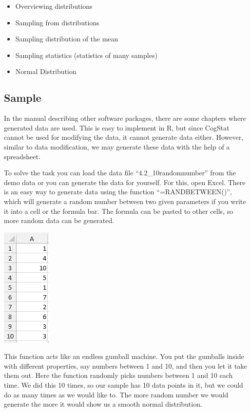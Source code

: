 \documentclass[
]{book}
\begin{document}
\begin{itemize}
\item
  Overviewing distributions
\item
  Sampling from distributions
\item
  Sampling distribution of the mean
\item
  Sampling statistics (statistics of many samples)
\item
  Normal Distribution
\end{itemize}

\hypertarget{sample-1}{%
\subsection{Sample}\label{sample-1}}

In the manual describing other software packages, there are some chapters where generated data are used. This is easy to implement in R, but since CogStat cannot be used for modifying the data, it cannot generate data either. However, similar to data modification, we may generate these data with the help of a spreadsheet.

To solve the task you can load the data file ``4.2\_10randomnumber'' from the demo data or you can generate the data for yourself. For this, open Excel. There is an easy way to generate data using the function ``=RANDBETWEEN()'', which will generate a random number between two given parameters if you write it into a cell or the formula bar. The formula can be pasted to other cells, so more random data can be generated.

\includegraphics{img/ch4/sample.png}

This function acts like an endless gumball machine. You put the gumballs inside with different properties, say numbers between 1 and 10, and then you let it take them out. Here the function randomly picks numbers between 1 and 10 each time. We did this 10 times, so our sample has 10 data points in it, but we could do as many times as we would like to. The more random number we would generate the more it would show us a smooth normal distribution.
\end{document}
